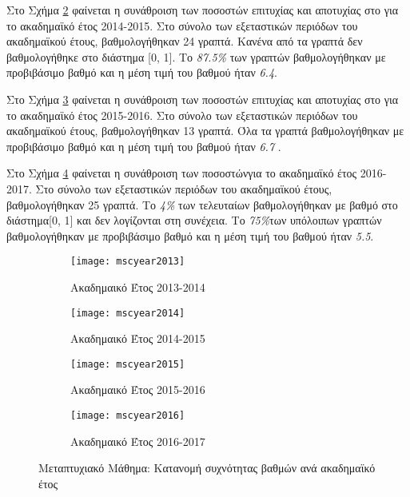 \documentclass[12pt,a4paper,final]{article}
\begin{document}
Στο Σχήμα \ref{fig:mscyear2014} φαίνεται η συνάθροιση  των ποσοστών επιτυχίας και αποτυχίας στο για το ακαδημαϊκό έτος  2014-2015.
Στο σύνολο των εξεταστικών περιόδων του ακαδημαϊκού έτους, βαθμολογήθηκαν 24 γραπτά. Κανένα από τα γραπτά δεν βαθμολογήθηκε στο διάστημα [0, 1]. Το \textit{87.5\%} των  γραπτών βαθμολογήθηκαν με προβιβάσιμο βαθμό και η μέση τιμή του βαθμού ήταν \textit{6.4}.\medskip

Στο Σχήμα \ref{fig:mscyear2015} φαίνεται η συνάθροιση  των ποσοστών επιτυχίας και αποτυχίας στο για το ακαδημαϊκό έτος  2015-2016.
Στο σύνολο των εξεταστικών περιόδων του ακαδημαϊκού έτους, βαθμολογήθηκαν 13 γραπτά. Όλα τα γραπτά βαθμολογήθηκαν με προβιβάσιμο βαθμό και η μέση τιμή του βαθμού ήταν \textit{6.7} . \medskip

Στο Σχήμα \ref{fig:mscyear2016} φαίνεται η συνάθροιση  των ποσοστώνγια το ακαδημαϊκό έτος  2016-2017.
Στο σύνολο των εξεταστικών περιόδων του ακαδημαϊκού έτους, βαθμολογήθηκαν 25 γραπτά. Το \textit{4\%} των τελευταίων βαθμολογήθηκαν με βαθμό στο διάστημα[0, 1] και δεν λογίζονται στη συνέχεια. Το \textit{75\%}των υπόλοιπων γραπτών βαθμολογήθηκαν με προβιβάσιμο βαθμό και η μέση τιμή του βαθμού ήταν \textit{5.5}.
\begin{figure}[h]
	\centering
	\begin{subfigure}[b]{0.475\textwidth}
		\centering 
		\texttt{[image: mscyear2013]}
		\caption{Ακαδημαικό Έτος 2013-2014}
		\label{fig:mscyear2013}
	\end{subfigure}
	\hfill
	\begin{subfigure}[b]{0.475\textwidth}
		\centering 
		\texttt{[image: mscyear2014]}
		\caption{Ακαδημαικό Έτος 2014-2015}
		\label{fig:mscyear2014}
	\end{subfigure}
	
	\begin{subfigure}[b]{0.475\textwidth}
		\centering 
		\texttt{[image: mscyear2015]}
		\caption{Ακαδημαικό Έτος 2015-2016}
		\label{fig:mscyear2015}
	\end{subfigure}
	\hfill
	\begin{subfigure}[b]{0.475\textwidth}
		\centering 
		\texttt{[image: mscyear2016]}
		\caption{Ακαδημαικό Έτος 2016-2017}
		\label{fig:mscyear2016}
	\end{subfigure}
	\caption{Μεταπτυχιακό Μάθημα: Κατανομή συχνότητας βαθμών ανά ακαδημαϊκό έτος}	
	\label{fig:mscdensYear}
\end{figure}
\end{document}

